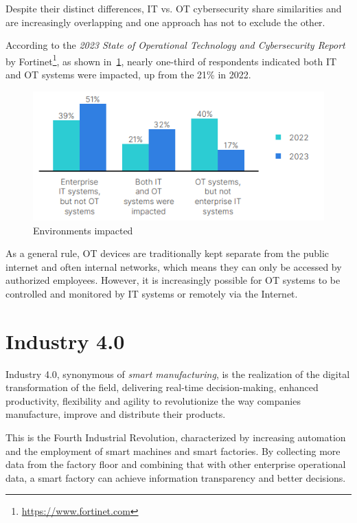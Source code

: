 Despite their distinct differences, IT vs. OT cybersecurity share similarities and are increasingly overlapping and one approach has not to exclude the other.

According to the \textit{2023 State of Operational Technology and Cybersecurity Report} by Fortinet\footnote{\url{https://www.fortinet.com}}, as shown in~\cref{fig:fortinet-intrusions-env-impacted}, nearly one-third of respondents indicated both IT and OT systems were impacted, up from the 21\% in 2022.

\begin{figure}[h]
  \centering
  \includegraphics[scale=0.8]{chapters/02/assets/fortinet-intrusions-env-impacted.png}
  \caption[Environments impacted]{Environments impacted}
  \label{fig:fortinet-intrusions-env-impacted}
\end{figure}


As a general rule, OT devices are traditionally kept separate from the public internet and often internal networks, which means they can only be accessed by authorized employees. However, it is increasingly possible for OT systems to be controlled and monitored by IT systems or remotely via the Internet.~\cite{it-vs-ot-cybersecurity}

\section{Industry 4.0}

Industry 4.0, synonymous of \textit{smart manufacturing}, is the realization of the digital transformation of the field, delivering real-time decision-making, enhanced productivity, flexibility and agility to revolutionize the way companies manufacture, improve and distribute their products.

This is the Fourth Industrial Revolution, characterized by increasing automation and the employment of smart machines and smart factories. By collecting more data from the factory floor and combining that with other enterprise operational data, a smart factory can achieve information transparency and better decisions.

